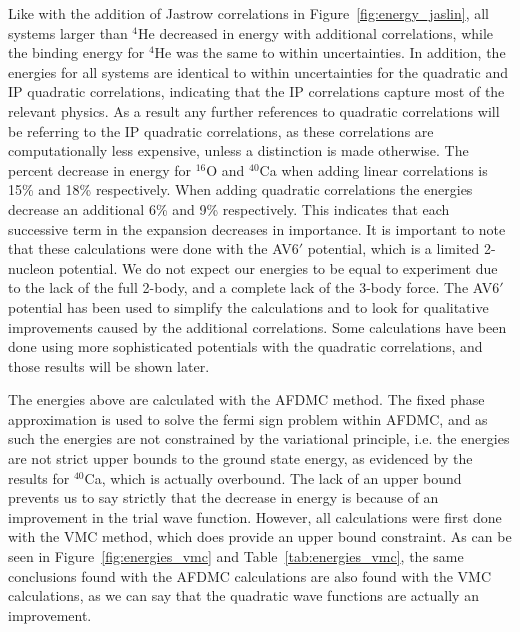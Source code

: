Like with the addition of Jastrow correlations in Figure~\ref{fig:energy_jaslin}, all systems larger than $^4$He decreased in energy with additional correlations, while the binding energy for $^4$He was the same to within uncertainties. In addition, the energies for all systems are identical to within uncertainties for the quadratic and IP quadratic correlations, indicating that the IP correlations capture most of the relevant physics. As a result any further references to quadratic correlations will be referring to the IP quadratic correlations, as these correlations are computationally less expensive, unless a distinction is made otherwise. The percent decrease in energy for $^{16}$O and $^{40}$Ca when adding linear correlations is 15\% and 18\% respectively. When adding quadratic correlations the energies decrease an additional 6\% and 9\% respectively. This indicates that each successive term in the expansion decreases in importance. It is important to note that these calculations were done with the AV6$'$ potential, which is a limited 2-nucleon potential. We do not expect our energies to be equal to experiment due to the lack of the full 2-body, and a complete lack of the 3-body force. The AV6$'$ potential has been used to simplify the calculations and to look for qualitative improvements caused by the additional correlations. Some calculations have been done using more sophisticated potentials with the quadratic correlations, and those results will be shown later.

The energies above are calculated with the AFDMC method. The fixed phase approximation is used to solve the fermi sign problem within AFDMC, and as such the energies are not constrained by the variational principle, i.e. the energies are not strict upper bounds to the ground state energy, as evidenced by the results for $^{40}$Ca, which is actually overbound. The lack of an upper bound prevents us to say strictly that the decrease in energy is because of an improvement in the trial wave function. However, all calculations were first done with the VMC method, which does provide an upper bound constraint. As can be seen in Figure~\ref{fig:energies_vmc} and Table~\ref{tab:energies_vmc}, the same conclusions found with the AFDMC calculations are also found with the VMC calculations, as we can say that the quadratic wave functions are actually an improvement.

